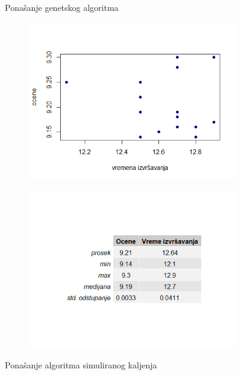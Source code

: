 \documentclass[a4paper]{article}
\begin{document}
\begin{figure}[H]
\begin{subfigure}{0.49\textwidth}
    \end{subfigure}
    \caption{Ponašanje genetskog algoritma}
    \label{fig:my_label}
    \centering
    \begin{subfigure}{0.49\textwidth}
    \includegraphics[width = \textwidth]{img/kaljenje_plot.png}
    \end{subfigure}
    \hfill
    \begin{subfigure}{0.49\textwidth}
    \includegraphics[width = \textwidth]{img/kaljenje_tabela.png}
    \end{subfigure}
    \caption{Ponašanje algoritma simuliranog kaljenja}
    \label{fig:my_label}
\end{figure}
\end{document}
